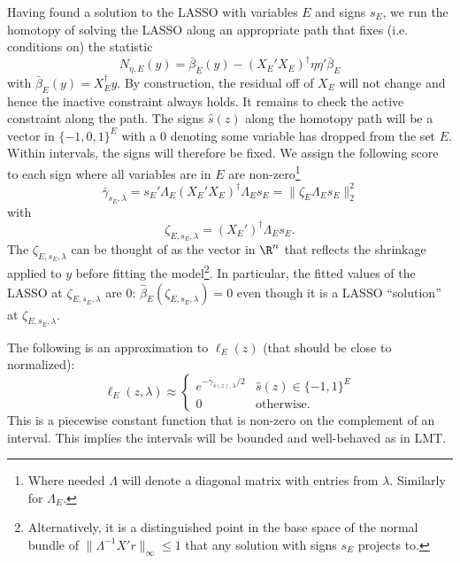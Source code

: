 \documentclass{article}
\newcommand{\OLS}{\bar{\beta}}
\newcommand{\REG}{\hat{\beta}}
\begin{document}
        Having found a solution to the LASSO with variables $E$ and signs $s_E$, we run the
        homotopy of solving the LASSO along an appropriate  path that fixes (i.e. conditions on)
        the statistic
        $$
        N_{\eta,E}(y) = \OLS_E(y) - (X_E'X_E)^{\dagger} \eta \eta'\OLS_E
        $$
        with $\OLS_E(y) = X_E^{\dagger}y$.
 By construction, the residual off of $X_E$ will not change
        and hence the inactive constraint always holds. It remains to
        check the active constraint along the path.  The signs $\hat{s}(z)$ along
        the homotopy path will be a vector in $\{-1,0,1\}^E$ with a 0
        denoting some variable has dropped from the set $E$. Within
        intervals, the signs will therefore be fixed. We assign the
        following score to each sign where all variables are in $E$
        are non-zero\footnote{Where needed $\Lambda$ will denote a
          diagonal matrix with entries from $\lambda$. Similarly for
          $\Lambda_E$. 
        }
        $$
        \bar{\gamma}_{s_E,\lambda} = s_E'\Lambda_E(X_E'X_E)^{\dagger}\Lambda_Es_E = \|\zeta_E\Lambda_Es_E\|^2_2
        $$
        with
        \begin{equation}
          \label{eq:sign:offsets}
        \zeta_{E,s_E,\lambda} = (X_E')^{\dagger}\Lambda_Es_E.
        \end{equation}
The
          $\zeta_{E,s_E,\lambda}$ can be thought of as the vector in $\R^n$
          that reflects the shrinkage applied to $y$ before fitting
          the model\footnote{Alternatively, it is a distinguished point 
          in the base space of the normal bundle of $\|\Lambda^{-1}X'r\|_{\infty} \leq 1$ that any solution with signs $s_E$ projects to.}. In particular, the fitted values of the LASSO at
          $\zeta_{E,s_E,\lambda}$ are 0: $\REG_E(\zeta_{E,s_E,\lambda})=0$ even though
          it is a LASSO ``solution'' at $\zeta_{E,s_E,\lambda}$.

        The following is an approximation to $\ell_E(z)$ (that should be close to normalized):
        \begin{equation}
          \label{eq:selective:RN}
        \ell_E(z,\lambda) \approx \begin{cases}
          e^{-\bar{\gamma}_{\hat{s}(z),\lambda}/2} & \hat{s}(z) \in \{-1,1\}^E \\
          0 & \text{otherwise.}
          \end{cases}
        \end{equation}
        This is a piecewise constant function that  is
        non-zero on the complement of an interval. This implies the intervals will be
        bounded and well-behaved as in LMT.
        
\end{document}
